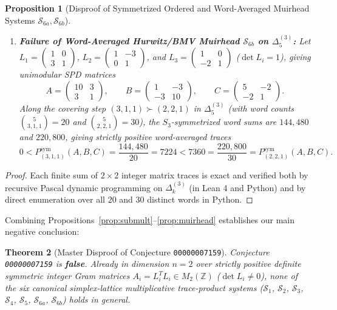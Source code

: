 \documentclass[11pt,a4paper]{article}
\newtheorem{theorem}{Theorem}[section]
\newtheorem{proposition}[theorem]{Proposition}
\theoremstyle{definition}
\theoremstyle{remark}
\newcommand{\DeltaLat}{\Delta}
\newcommand{\Psym}{P^{\mathrm{sym}}}
\begin{document}
\begin{proposition}[Disproof of Symmetrized Ordered and Word-Averaged Muirhead Systems $\mathcal{S}_{6a}, \mathcal{S}_{6b}$]
\begin{enumerate}
\item \textbf{Failure of Word-Averaged Hurwitz/BMV Muirhead $\mathcal{S}_{6b}$ on $\DeltaLat_5^{(3)}$:} Let $L_1 = \begin{pmatrix} 1 & 0 \\ 3 & 1 \end{pmatrix}$, $L_2 = \begin{pmatrix} 1 & -3 \\ 0 & 1 \end{pmatrix}$, and $L_3 = \begin{pmatrix} 1 & 0 \\ -2 & 1 \end{pmatrix}$ ($\det L_i = 1$), giving unimodular SPD matrices
\[
A = \begin{pmatrix} 10 & 3 \\ 3 & 1 \end{pmatrix}, \qquad
B = \begin{pmatrix} 1 & -3 \\ -3 & 10 \end{pmatrix}, \qquad
C = \begin{pmatrix} 5 & -2 \\ -2 & 1 \end{pmatrix}.
\]
Along the covering step $(3, 1, 1) \succ (2, 2, 1)$ in $\DeltaLat_5^{(3)}$ (with word counts $\binom{5}{3,1,1} = 20$ and $\binom{5}{2,2,1} = 30$), the $S_3$-symmetrized word sums are $144{,}480$ and $220{,}800$, giving strictly positive word-averaged traces
\[
0 < \Psym_{(3,1,1)}(A, B, C) = \frac{144{,}480}{20} = 7224 < 7360 = \frac{220{,}800}{30} = \Psym_{(2,2,1)}(A, B, C).
\]
\end{enumerate}
\end{proposition}
\begin{proof}
Each finite sum of $2 \times 2$ integer matrix traces is exact and verified both by recursive Pascal dynamic programming on $\DeltaLat_k^{(3)}$ (in Lean 4 and Python) and by direct enumeration over all $20$ and $30$ distinct words in Python.
\end{proof}

Combining Propositions~\ref{prop:submult}--\ref{prop:muirhead} establishes our main negative conclusion:

\begin{theorem}[Master Disproof of Conjecture \texttt{00000007159}]\label{thm:main}
Conjecture \texttt{00000007159} is \textbf{false}. Already in dimension $n = 2$ over strictly positive definite symmetric integer Gram matrices $A_i = L_i^T L_i \in M_2(\mathbb{Z})$ ($\det L_i \ne 0$), none of the six canonical simplex-lattice multiplicative trace-product systems ($\mathcal{S}_1$, $\mathcal{S}_2$, $\mathcal{S}_3$, $\mathcal{S}_4$, $\mathcal{S}_5$, $\mathcal{S}_{6a}$, $\mathcal{S}_{6b}$) holds in general.
\end{theorem}
\end{document}
